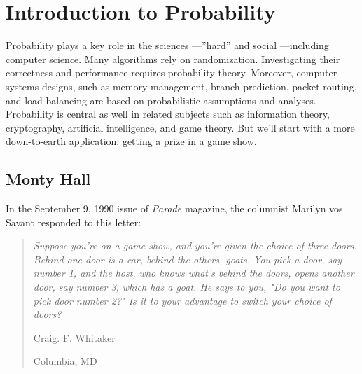 \chapter{Introduction to Probability}\label{probability_chap}


Probability plays a key role in the sciences ---''hard'' and social
---including computer science.  Many algorithms rely on randomization.
Investigating their correctness and performance requires probability
theory.  Moreover, computer systems designs, such as memory management,
branch prediction, packet routing, and load balancing are based on
probabilistic assumptions and analyses.  Probability is central as well in
related subjects such as information theory, cryptography, artificial
intelligence, and game theory.  But we'll start with a more down-to-earth
application: getting a prize in a game show.

\section{Monty Hall}

In the September 9, 1990 issue of \textit{Parade} magazine, the
columnist Marilyn vos Savant responded to this letter:


\begin{quotation}
\noindent \textit{Suppose you're on a game show, and you're given the
choice of three doors.  Behind one door is a car, behind the others,
goats.  You pick a door, say number 1, and the host, who knows what's
behind the doors, opens another door, say number 3, which has a goat.
He says to you, "Do you want to pick door number 2?"  Is it to your
advantage to switch your choice of doors?}

\vspace{1ex}

\hspace{3in} Craig. F. Whitaker

\hspace{3in} Columbia, MD
\end{quotation}

